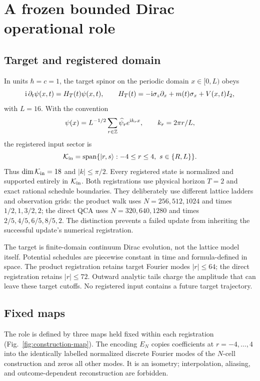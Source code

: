 \section{A frozen bounded Dirac operational role}
\label{sec:role}

\subsection{Target and registered domain}

In units $\hbar=c=1$, the target spinor on the periodic domain $x\in[0,L)$
obeys
\begin{equation}
  \mathrm{i}\,\partial_t\psi(x,t)=H_T(t)\psi(x,t),\qquad
  H_T(t)=-\mathrm{i}\sigma_z\partial_x+m(t)\sigma_x+V(x,t)I_2,
  \label{eq:target-hamiltonian}
\end{equation}
with $L=16$.  With the convention
\begin{equation}
  \psi(x)=L^{-1/2}\sum_{r\in\mathbb Z}\widehat\psi_r
  e^{\mathrm{i} k_r x},\qquad k_r=2\pi r/L,
\end{equation}
the registered input sector is
\begin{equation}
  \mathcal{K}_{\mathrm{in}}=\operatorname{span}\{\lvert r,s\rangle:-4\le r\le4,
  \ s\in\{R,L\}\}.
  \label{eq:input-sector}
\end{equation}
Thus $\dim\mathcal{K}_{\mathrm{in}}=18$ and $|k|\le\pi/2$.  Every registered state is normalized
and supported entirely in $\mathcal{K}_{\mathrm{in}}$.  Both registrations use physical horizon
$T=2$ and exact rational schedule boundaries.  They deliberately use
different lattice ladders and observation grids: the product walk uses
$N=256,512,1024$ and times $1/2,1,3/2,2$; the direct QCA uses
$N=320,640,1280$ and times $2/5,4/5,6/5,8/5,2$.  The distinction prevents a
failed update from inheriting the successful update's numerical
registration.

The target is finite-domain continuum Dirac evolution, not the lattice model
itself.  Potential schedules are piecewise constant in time and
formula-defined in space.  The product registration retains target Fourier
modes $|r|\le64$; the direct registration retains $|r|\le72$.  Outward analytic
tails charge the amplitude that can leave these target cutoffs.  No registered
input contains a future target trajectory.

\subsection{Fixed maps}

The role is defined by three maps held fixed within each registration
(Fig.~\ref{fig:construction-map}).  The encoding $E_N$ copies coefficients at
$r=-4,\ldots,4$ into the identically labelled normalized discrete Fourier
modes of the $N$-cell construction and zeros all other modes.  It is an
isometry; interpolation, aliasing, and outcome-dependent reconstruction are
forbidden.

